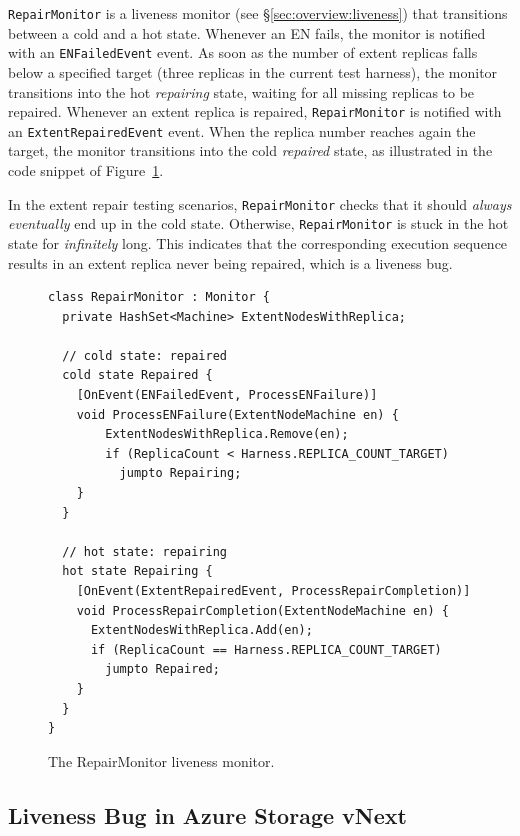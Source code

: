\texttt{RepairMonitor} is a \psharp liveness monitor (see \S\ref{sec:overview:liveness}) that transitions between a cold and a hot state. Whenever an EN fails, the monitor is notified with an \texttt{ENFailedEvent} event. As soon as the number of extent replicas falls below a specified target (three replicas in the current \psharp test harness), the monitor transitions into the hot \emph{repairing} state, waiting for all missing replicas to be repaired. Whenever an extent replica is repaired, \texttt{RepairMonitor} is notified with an \texttt{ExtentRepairedEvent} event. When the replica number reaches again the target, the monitor transitions into the cold \emph{repaired} state, as illustrated in the code snippet of Figure~\ref{fig:monitor}.

In the extent repair testing scenarios, \texttt{RepairMonitor} checks that it should \emph{always eventually} end up in the cold state. Otherwise, \texttt{RepairMonitor} is stuck in the hot state for \emph{infinitely} long. This indicates that the corresponding execution sequence results in an extent replica never being repaired, which is a liveness bug.

\begin{figure}[t]
\begin{lstlisting}
class RepairMonitor : Monitor {
  private HashSet<Machine> ExtentNodesWithReplica;

  // cold state: repaired
  cold state Repaired {
    [OnEvent(ENFailedEvent, ProcessENFailure)]
    void ProcessENFailure(ExtentNodeMachine en) {
        ExtentNodesWithReplica.Remove(en);
        if (ReplicaCount < Harness.REPLICA_COUNT_TARGET)				
          jumpto Repairing;
    }
  }

  // hot state: repairing
  hot state Repairing {
    [OnEvent(ExtentRepairedEvent, ProcessRepairCompletion)]
    void ProcessRepairCompletion(ExtentNodeMachine en) {
      ExtentNodesWithReplica.Add(en);
      if (ReplicaCount == Harness.REPLICA_COUNT_TARGET)
        jumpto Repaired;
    }
  }
}
\end{lstlisting}
\vspace{-4mm}
\caption{The RepairMonitor liveness monitor.}
\label{fig:monitor}
\vspace{-2mm}
\end{figure}

\subsection{Liveness Bug in Azure Storage vNext}
\label{sec:method:azurestore}

